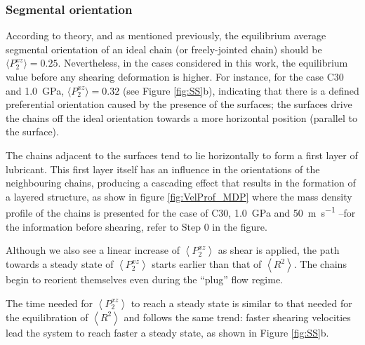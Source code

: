 \documentclass[aps,prb,reprint,superscriptaddress, a4paper]{revtex4-1}
\begin{document}

\subsubsection{Segmental orientation}
 
 According to theory, and as mentioned previously, the equilibrium average segmental orientation of an ideal chain (or freely-jointed chain)  should be $\langle P_{2}^{xz}\rangle=0.25$. Nevertheless, in the cases considered in this work, the equilibrium value before any shearing deformation is higher. For instance, for the case C30 and  \SI{1.0}{\giga\pascal}, $\langle P_{2}^{xz}\rangle=0.32$ (see Figure \ref{fig:SS}b), indicating that there is  a defined preferential orientation caused by the presence of the surfaces; the surfaces  drive  the chains off the ideal orientation towards a more horizontal position (parallel to the surface). %
 
The chains adjacent to the surfaces tend to lie horizontally to form a first layer of lubricant. This first layer itself has an influence in the orientations of the neighbouring chains, producing  a cascading effect that results in the formation of  a layered structure, as show in figure \ref{fig:VelProf_MDP} where the mass density profile of the chains is presented for the case of  C30,  \SI{1.0}{\giga\pascal} and  \SI{50}{\meter\per\second} --for the information before shearing, refer to Step 0 in the figure. 

Although we also see a linear increase of $\left<P_{2}^{xz} \right> $ as shear is applied, the path towards a steady state of  $\left<P_{2}^{xz} \right> $ starts earlier than that of  $\left< R^2 \right> $. The chains begin to reorient themselves even during the ``plug'' flow regime. %

The time needed for $\left<P_{2}^{xz} \right>$ to reach a steady state  is similar to that needed for the equilibration of  $\left< R^2 \right> $ and follows the same trend: faster shearing velocities lead the system  to reach faster a steady state, as shown in  Figure \ref{fig:SS}b.

\end{document}
